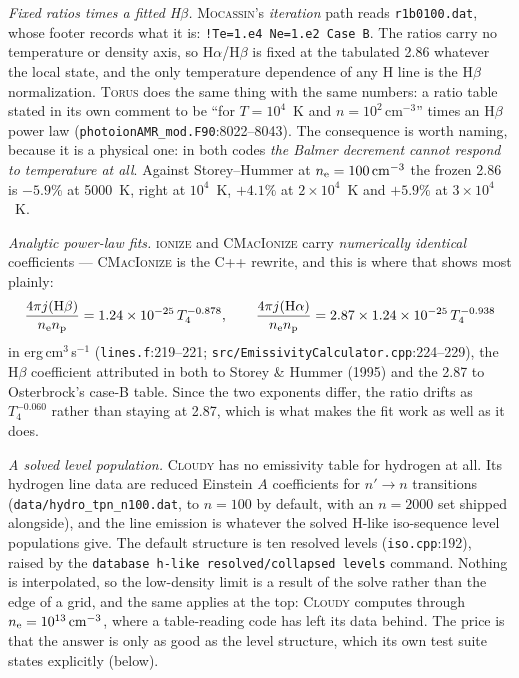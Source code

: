 \documentclass[english,a4paper]{my_memo}
\newcommand{\code}[1]{\texttt{#1}}
\newcommand{\Wood}{\textsc{ionize}}
\newcommand{\CMI}{\textsc{CMacIonize}}
\newcommand{\Torus}{\textsc{Torus}}
\newcommand{\Mocassin}{\textsc{Mocassin}}
\newcommand{\Cloudy}{\textsc{Cloudy}}
\newcommand{\nelec}{n_{\rm e}}
\begin{document}
\emph{Fixed ratios times a fitted H$\beta$.}  \Mocassin{}'s \emph{iteration}
path reads \code{r1b0100.dat}, whose footer records what it is:
\code{!Te=1.e4 Ne=1.e2 Case B}.  The ratios carry no temperature or density
axis, so H$\alpha$/H$\beta$ is fixed at the tabulated 2.86 whatever the local
state, and the only temperature dependence of any H line is the H$\beta$
normalization.  \Torus{} does the same thing with the same numbers: a ratio
table stated in its own comment to be ``for $T = 10^4$~K and
$n = 10^2\,\mathrm{cm^{-3}}$'' times an H$\beta$ power law
(\code{photoionAMR\_mod.F90}:8022--8043).  The consequence is worth naming,
because it is a physical one: in both codes \emph{the Balmer decrement cannot
respond to temperature at all}.  Against Storey--Hummer at
$\nelec = 100\,\mathrm{cm^{-3}}$ the frozen 2.86 is $-5.9\%$ at 5000~K, right
at $10^4$~K, $+4.1\%$ at $2\times10^4$~K and $+5.9\%$ at $3\times10^4$~K.

\emph{Analytic power-law fits.}  \Wood{} and \CMI{} carry
\emph{numerically identical} coefficients --- \CMI{} is the C++ rewrite, and
this is where that shows most plainly:
\begin{equation}
  \frac{4\pi j(\mathrm{H}\beta)}{\nelec n_{\rm p}}
    = 1.24\times10^{-25}\,T_4^{-0.878},
  \qquad
  \frac{4\pi j(\mathrm{H}\alpha)}{\nelec n_{\rm p}}
    = 2.87 \times 1.24\times10^{-25}\,T_4^{-0.938}
  \label{eq:woodfit}
\end{equation}
in erg\,cm$^3$\,s$^{-1}$ (\code{lines.f}:219--221;
\code{src/EmissivityCalculator.cpp}:224--229), the H$\beta$ coefficient
attributed in both to Storey \& Hummer (1995) and the 2.87 to Osterbrock's
case-B table.  Since the two exponents differ, the ratio drifts as
$T_4^{-0.060}$ rather than staying at 2.87, which is what makes the fit work
as well as it does.

\emph{A solved level population.}  \Cloudy{} has no emissivity table for
hydrogen at all.  Its hydrogen line data are reduced Einstein $A$ coefficients
for $n' \rightarrow n$ transitions (\code{data/hydro\_tpn\_n100.dat}, to
$n = 100$ by default, with an $n = 2000$ set shipped alongside), and the line
emission is whatever the solved H-like iso-sequence level populations give.
The default structure is ten resolved levels (\code{iso.cpp}:192), raised by
the \code{database h-like resolved/collapsed levels} command.  Nothing is
interpolated, so the low-density limit is a result of the solve rather than the
edge of a grid, and the same applies at the top: \Cloudy{} computes through
$\nelec = 10^{13}\,\mathrm{cm^{-3}}$, where a table-reading code has left its
data behind.  The price is that the answer is only as good as the level
structure, which its own test suite states explicitly (below).
\end{document}
